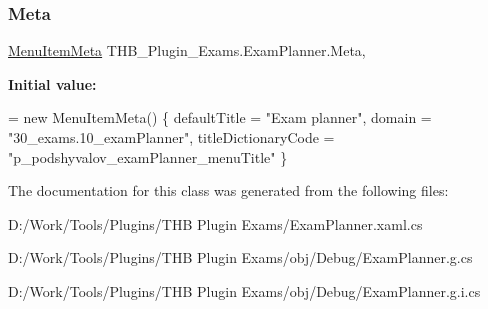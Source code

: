 \subsubsection{\texorpdfstring{Meta}{Meta}}
{\footnotesize\ttfamily \mbox{\hyperlink{class_uniform_client_1_1_plugins_1_1_menu_item_meta}{Menu\+Item\+Meta}} T\+H\+B\+\_\+\+Plugin\+\_\+\+Exams.\+Exam\+Planner.\+Meta\hspace{0.3cm}{\ttfamily [get]}, {\ttfamily [set]}}

{\bfseries Initial value\+:}
\begin{DoxyCode}
= \textcolor{keyword}{new} MenuItemMeta()
        \{
            defaultTitle = \textcolor{stringliteral}{"Exam planner"},
            domain = \textcolor{stringliteral}{"30\_exams.10\_examPlanner"},
            titleDictionaryCode = \textcolor{stringliteral}{"p\_podshyvalov\_examPlanner\_menuTitle"}
        \}
\end{DoxyCode}


The documentation for this class was generated from the following files\+:\begin{DoxyCompactItemize}
\item 
D\+:/\+Work/\+Tools/\+Plugins/\+T\+H\+B Plugin Exams/Exam\+Planner.\+xaml.\+cs\item 
D\+:/\+Work/\+Tools/\+Plugins/\+T\+H\+B Plugin Exams/obj/\+Debug/Exam\+Planner.\+g.\+cs\item 
D\+:/\+Work/\+Tools/\+Plugins/\+T\+H\+B Plugin Exams/obj/\+Debug/Exam\+Planner.\+g.\+i.\+cs\end{DoxyCompactItemize}
